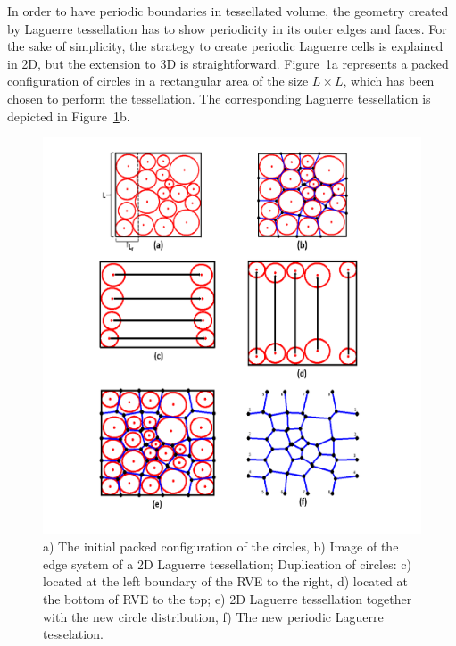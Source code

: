 \documentclass[review]{elsarticle}
\begin{document}
In order to have periodic boundaries in tessellated volume, the geometry created by Laguerre tessellation has to show periodicity in its outer edges and faces. For the sake of simplicity, the strategy to create periodic Laguerre cells is explained in 2D, but the extension to 3D is straightforward. Figure~\ref{fig:Periodic}a represents a packed configuration of circles in a rectangular area of the size $L \times L$, which has been chosen to perform the tessellation. The corresponding Laguerre tessellation is depicted in Figure~\ref{fig:Periodic}b.
\begin{figure}[hb]
  \centering
  \includegraphics[scale=0.6]{Periodicity}
  \captionsetup{justification=centering}
  \caption[Close up of \textit{Hemidactylus} sp.]
   {a) The initial packed configuration of the circles, b) Image of the edge system of a 2D Laguerre tessellation; Duplication of circles: c) located at the left boundary of the RVE to the right, d) located at the bottom of RVE to the top; e) 2D Laguerre tessellation together with the new circle distribution, f) The new periodic Laguerre tesselation.}
   \label{fig:Periodic}
\end{figure}
\end{document}
